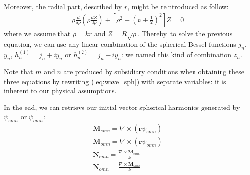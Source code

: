 \documentclass{article}
\numberwithin{equation}{section}
\begin{document}
Moreover, the radial part, described by $r$, might be reintroduced as follow:
\begin{align}\label{eq:radial_part}
\rho\frac{d }{d\rho}(\rho\frac{d Z}{d\rho})+[\rho^{2}-(n+\frac{1}{2})^{2}]Z=0
\end{align}
where we assume that $\rho=kr$ and $Z=R\sqrt{\rho}$. Thereby, to solve the previous equation, we can use any linear combination of the spherical Bessel functions $j_{n}$, $y_{n}$, $h^{(1)}_{n}=j_{n}+iy_{n}$ or $h^{(2)}_{n}=j_{n}-iy_{n}$: we named this kind of combination $z_{n}$.

Note that $m$ and $n$ are produced by subsidiary conditions when obtaining these three equations by rewriting (\ref{eq:wave_sph}) with separate variables: it is inherent to our physical assumptions.

In the end, we can retrieve our initial vector spherical harmonics generated by $\psi_{emn}$ or $\psi_{omn}$:
\begin{align}
\textbf{M}_{emn}=\nabla \times (\textbf{r}\psi_{emn})\\
\textbf{M}_{omn}=\nabla \times (\textbf{r}\psi_{omn})\\
\textbf{N}_{emn}=\frac{\nabla \times \textbf{M}_{emn}}{k}\\
\textbf{N}_{omn}=\frac{\nabla \times \textbf{M}_{omn}}{k}
\end{align}
\end{document}

